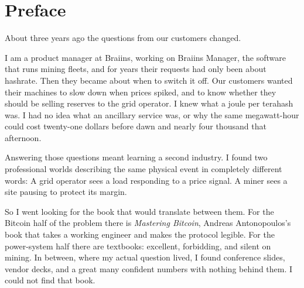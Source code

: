 \chapter*{Preface}

About three years ago the questions from our customers changed.

I am a
product manager at Braiins, working on Braiins Manager, the software that runs
mining fleets, and for years their requests had only been about hashrate. Then they
became about when to switch it off. Our customers wanted their machines to slow down when
prices spiked, and to know whether they should be selling reserves to the grid
operator. I knew what a joule per terahash was. I had no
idea what an ancillary service was, or why the same megawatt-hour could cost
twenty-one dollars before dawn and nearly four thousand that afternoon. %

Answering those questions meant learning a second industry. I found two professional worlds describing the same physical event in completely different words: A grid operator sees a load responding to a price
signal. A miner sees a site pausing to protect its margin.

So I went looking for the book that would translate between them. For the
Bitcoin half of the problem there is \textit{Mastering Bitcoin}, Andreas
Antonopoulos's book that takes a working engineer and makes the protocol
legible. For the power-system half there are textbooks: excellent, forbidding,
and silent on mining. In between, where my actual question lived, I found
conference slides, vendor decks, and a great many confident numbers with
nothing behind them. I could not find that book.

